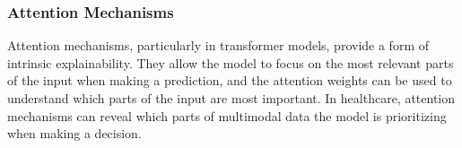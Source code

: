 \documentclass[pdflatex,sn-mathphys-num]{sn-jnl}%
\theoremstyle{thmstyleone}%
\theoremstyle{thmstyletwo}%
\theoremstyle{thmstylethree}%
\begin{document}
\begin{itemize}



\subsubsection{Attention Mechanisms}

Attention mechanisms, particularly in transformer models, provide a form of intrinsic explainability. They allow the model to focus on the most relevant parts of the input when making a prediction, and the attention weights can be used to understand which parts of the input are most important. In healthcare, attention mechanisms can reveal which parts of multimodal data the model is prioritizing when making a decision.


\end{itemize}
\end{document}
